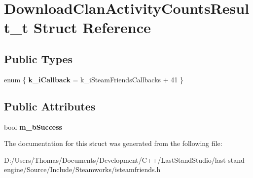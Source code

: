 \hypertarget{structDownloadClanActivityCountsResult__t}{}\section{Download\+Clan\+Activity\+Counts\+Result\+\_\+t Struct Reference}
\label{structDownloadClanActivityCountsResult__t}
\subsection*{Public Types}
\begin{DoxyCompactItemize}
\item 
\hypertarget{structDownloadClanActivityCountsResult__t_a79ba3c749916862c52ee1115ba634332}{}enum \{ {\bfseries k\+\_\+i\+Callback} = k\+\_\+i\+Steam\+Friends\+Callbacks + 41
 \}\label{structDownloadClanActivityCountsResult__t_a79ba3c749916862c52ee1115ba634332}

\end{DoxyCompactItemize}
\subsection*{Public Attributes}
\begin{DoxyCompactItemize}
\item 
\hypertarget{structDownloadClanActivityCountsResult__t_ac3c10df91d31ff62f3fc79abee3e4113}{}bool {\bfseries m\+\_\+b\+Success}\label{structDownloadClanActivityCountsResult__t_ac3c10df91d31ff62f3fc79abee3e4113}

\end{DoxyCompactItemize}


The documentation for this struct was generated from the following file\+:\begin{DoxyCompactItemize}
\item 
D\+:/\+Users/\+Thomas/\+Documents/\+Development/\+C++/\+Last\+Stand\+Studio/last-\/stand-\/engine/\+Source/\+Include/\+Steamworks/isteamfriends.\+h\end{DoxyCompactItemize}
